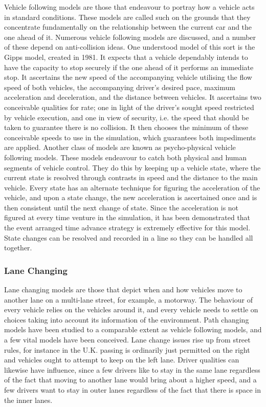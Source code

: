 \documentclass[11pt,a4paper]{article}
\begin{document}
Vehicle following models are those that endeavour to portray how a vehicle acts in standard conditions. These models are called such on the grounds that they concentrate fundamentally on the relationship between the current car and the one ahead of it. Numerous vehicle following models are discussed, and a number of these depend on anti-collision ideas.\newline 
One understood model of this sort is the Gipps model, created in 1981. It expects that a vehicle dependably intends to have the capacity to stop securely if the one ahead of it performs an immediate stop. It ascertains the new speed of the accompanying vehicle utilising the flow speed of both vehicles, the accompanying driver's desired pace, maximum acceleration and deceleration, and the distance between vehicles. It ascertains two conceivable qualities for rate; one in light of the driver's sought speed restricted by vehicle execution, and one in view of security, i.e. the speed that should be taken to guarantee there is no collision. It then chooses the minimum of these conceivable speeds to use in the simulation, which guarantees both impediments are applied.\newline
Another class of models are known as psycho-physical vehicle following models. These models endeavour to catch both physical and human segments of vehicle control. They do this by keeping up a vehicle state, where the current state is resolved through contrasts in speed and the distance to the main vehicle. Every state has an alternate technique for figuring the acceleration of the vehicle, and upon a state change, the new acceleration is ascertained once and is then consistent until the next change of state. Since the acceleration is not figured at every time venture in the simulation, it has been demonstrated that the event arranged time advance strategy is extremely effective for this model. State changes can be resolved and recorded in a line so they can be handled all together.


\subsubsection{\textbf{Lane Changing}}

Lane changing models are those that depict when and how vehicles move to another lane on a multi-lane street, for example, a motorway. The behaviour of every vehicle relies on the vehicles around it, and every vehicle needs to settle on choices taking into account its information of the environment. Path changing models have been studied to a comparable extent as vehicle following models, and a few vital models have been conceived.\newline
Lane change issues rise up from street rules, for instance in the U.K. passing is ordinarily just permitted on the right and vehicles ought to attempt to keep on the left lane. Driver qualities can likewise have influence, since a few drivers like to stay in the same lane regardless of the fact that moving to another lane would bring about a higher speed, and a few drivers want to stay in outer lanes regardless of the fact that there is space in the inner lanes.
\end{document}
